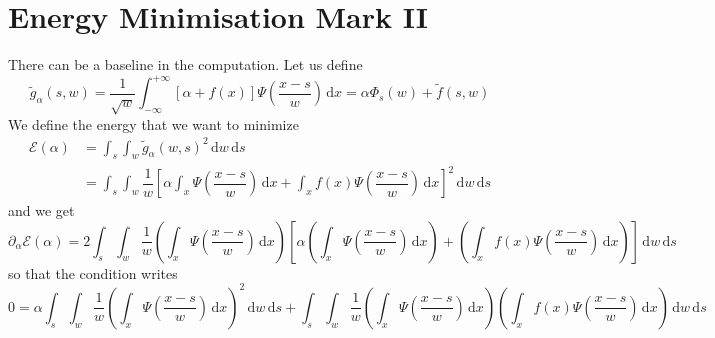 \documentclass{revtex4}
\begin{document}
\section{Energy Minimisation Mark II}
There can be a baseline in the computation. Let us define
\begin{equation}
	\tilde{g}_\alpha(s,w) = \dfrac{1}{\sqrt{w}}
	\int_{-\infty}^{+\infty} \left[\alpha + f(x) \right]\Psi\left(\dfrac{x-s}{w}\right) \, \mathrm{d}x
	= \alpha \Phi_s(w) + \tilde{f}(s,w) 
\end{equation}
We define the energy that we want to minimize
\begin{align}
	\mathcal{E}(\alpha)  & = \int_s \int_w \tilde{g}_\alpha(w,s)^2 \,\mathrm{d}w  \,\mathrm{d}s \\
	 & = \int_s \int_w \dfrac{1}{w} 
	 \left[ \alpha \int_x \Psi\left(\dfrac{x-s}{w}\right) \,\mathrm{d}x
	  + \int_x f(x) \Psi\left(\dfrac{x-s}{w}\right) \,\mathrm{d}x
	  \right]^2 \,\mathrm{d}w  \,\mathrm{d}s
\end{align}
and we get
\begin{equation}
	\partial_\alpha \mathcal{E}(\alpha) = 2
	\int_s \int_w \dfrac{1}{w} 
	\left(\int_x \Psi\left(\dfrac{x-s}{w}\right) \,\mathrm{d}x \right) 
	\left[ \alpha \left(\int_x \Psi\left(\dfrac{x-s}{w}\right) \,\mathrm{d}x \right) +  \left(\int_x f(x)\Psi\left(\dfrac{x-s}{w}\right) \,\mathrm{d}x \right) \right]
	\,\mathrm{d}w  \,\mathrm{d}s
\end{equation}
so that the condition writes
\begin{equation}
	0 = \alpha \int_s \int_w \dfrac{1}{w} \left(\int_x \Psi\left(\dfrac{x-s}{w}\right) \,\mathrm{d}x \right)^2 \,\mathrm{d}w  \,\mathrm{d}s + 
	 \int_s \int_w \dfrac{1}{w} \left(\int_x \Psi\left(\dfrac{x-s}{w}\right) \,\mathrm{d}x \right) \left(\int_x f(x) \Psi\left(\dfrac{x-s}{w}\right) \,\mathrm{d}x \right)\,\mathrm{d}w  \,\mathrm{d}s
\end{equation}
\end{document}
